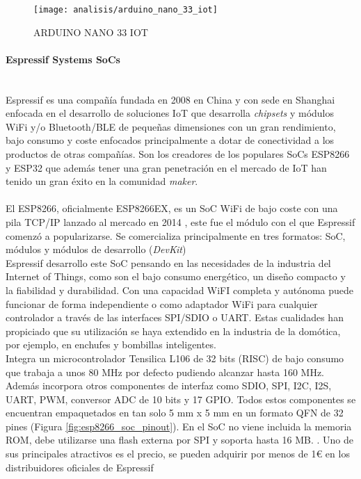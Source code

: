 \documentclass[../proyecto.tex]{subfiles}
\begin{document}
\begin{figure}[H]
\centering
\texttt{[image: analisis/arduino\_nano\_33\_iot]}
\caption{ARDUINO NANO 33 IOT}
\label{fig:arduino_nano_33_iot}
\end{figure}

\paragraph{Espressif Systems SoCs}\mbox{}\\
Espressif es una compañía fundada en 2008 en China y con sede en Shanghai enfocada en el desarrollo de soluciones IoT que desarrolla \textit{chipsets} y módulos WiFi y/o Bluetooth/BLE de pequeñas dimensiones con un gran rendimiento, bajo consumo y coste enfocados principalmente a dotar de conectividad a los productos de otras compañías. Son los creadores de los populares SoCs ESP8266 y ESP32 que además tener una gran penetración en el mercado de IoT han tenido un gran éxito en la comunidad \textit{maker}.\\

\\

El ESP8266, oficialmente ESP8266EX, es un SoC WiFi de bajo coste con una pila TCP/IP lanzado al mercado en 2014 \cite{esp8266_overview}, este fue el módulo con el que Espressif comenzó a popularizarse. Se comercializa principalmente en tres formatos: SoC, módulos y módulos de desarrollo (\textit{DevKit})\\

Espressif desarrollo este SoC pensando en las necesidades de la industria del Internet of Things, como son el bajo consumo energético, un diseño compacto y la fiabilidad y durabilidad. Con una capacidad WiFI completa y autónoma puede funcionar de forma independiente o como adaptador WiFi para cualquier controlador a través de las interfaces SPI/SDIO o UART. Estas cualidades han propiciado que su utilización se haya extendido en la industria de la domótica, por ejemplo, en enchufes y bombillas inteligentes. \\

Integra un microcontrolador Tensilica L106 de 32 bits (RISC) de bajo consumo que trabaja a unos 80 MHz por defecto pudiendo alcanzar hasta 160 MHz. Además incorpora otros componentes de interfaz como SDIO, SPI, I2C, I2S, UART, PWM, conversor ADC de 10 bits y 17 GPIO. Todos estos componentes se encuentran empaquetados en tan solo 5 mm x 5 mm en un formato QFN de 32 pines (Figura \ref{fig:esp8266_soc_pinout}). En el SoC no viene incluida la memoria ROM, debe utilizarse una flash externa por SPI y soporta hasta 16 MB. \cite{esp8266_datasheet}. Uno de sus principales atractivos es el precio, se pueden adquirir por menos de 1€ en los distribuidores oficiales de Espressif \cite{espressif_provider_digikey} \cite{espressif_provider_mouser}\\
\end{document}
